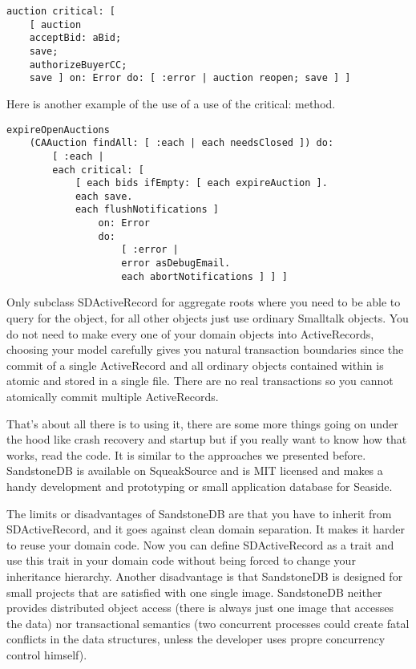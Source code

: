 \documentclass[a4paper,10pt,twoside]{book}
\newcommand{\ct}[1]{{\small\ttfamily\textup{#1}}}
\begin{document}
\begin{lstlisting}
auction critical: [
    [ auction
    acceptBid: aBid;
    save;
    authorizeBuyerCC;
    save ] on: Error do: [ :error | auction reopen; save ] ]
\end{lstlisting}

Here is another example of the use of a use of the \ct{critical:} method.

\begin{lstlisting}
expireOpenAuctions
    (CAAuction findAll: [ :each | each needsClosed ]) do:
        [ :each |
        each critical: [
            [ each bids ifEmpty: [ each expireAuction ].
            each save.
            each flushNotifications ]
                on: Error
                do:
                    [ :error |
                    error asDebugEmail.
                    each abortNotifications ] ] ]
\end{lstlisting}

Only subclass \ct{SDActiveRecord} for aggregate roots where you need to be able to query for the object, for all other objects just use ordinary Smalltalk objects. You do not need to make every one of your domain objects into ActiveRecords, choosing your model carefully gives you natural transaction boundaries since the commit of a single ActiveRecord and all ordinary objects contained within is atomic and stored in a single file. There are no real transactions so you cannot atomically commit multiple ActiveRecords.

That's about all there is to using it, there are some more things going on under the hood like crash recovery and startup but if you really want to know how that works, read the code. It is similar to the approaches we presented before. SandstoneDB is available on SqueakSource and is MIT licensed and makes a handy development and prototyping or small application database for Seaside.

The limits or disadvantages of SandstoneDB are that you have to inherit from SDActiveRecord, and it goes against clean domain separation. It makes it harder to reuse your domain code. Now you can define SDActiveRecord as a trait and use this trait in your domain code without  being forced to change your inheritance hierarchy. Another disadvantage is that SandstoneDB is designed for small projects that are satisfied with one single image. SandstoneDB neither provides distributed object access (there is always just one image that accesses the data) nor transactional semantics (two concurrent processes could create fatal conflicts in the data structures, unless the developer uses propre concurrency control himself).
\end{document}
